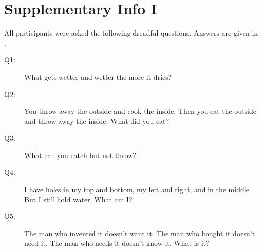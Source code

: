 \chapter{Supplementary Info I}
\label{apdx:supplementaryInfoI}

All participants were asked the following dreadful questions. Answers are given in .

\begin{description} 
    \item[Q1:] What gets wetter and wetter the more it dries?
    \item[Q2:] You throw away the outside and cook the inside. Then you eat the outside and throw away the inside. What did you eat?
	\item[Q3:] What can you catch but not throw?
	\item[Q4:] I have holes in my top and bottom, my left and right, and in the middle. But I still hold water. What am I?
	\item[Q5:] The man who invented it doesn't want it. The man who bought it doesn't need it. The man who needs it doesn't know it. What is it?      
\end{description}